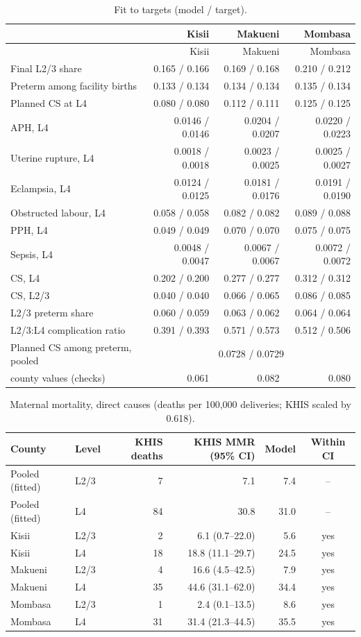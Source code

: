 \documentclass[11pt]{article}
\begin{document}
\begin{longtable}{lrrr}
\caption{Fit to targets (model / target).}\label{tab:fit}\\
\toprule
 & Kisii & Makueni & Mombasa \\
\midrule
\endfirsthead
\toprule
 & Kisii & Makueni & Mombasa \\
\midrule
\endhead
Final L2/3 share & 0.165 / 0.166 & 0.169 / 0.168 & 0.210 / 0.212 \\
Preterm among facility births & 0.133 / 0.134 & 0.134 / 0.134 & 0.135 / 0.134 \\
Planned CS at L4 & 0.080 / 0.080 & 0.112 / 0.111 & 0.125 / 0.125 \\
APH, L4 & 0.0146 / 0.0146 & 0.0204 / 0.0207 & 0.0220 / 0.0223 \\
Uterine rupture, L4 & 0.0018 / 0.0018 & 0.0023 / 0.0025 & 0.0025 / 0.0027 \\
Eclampsia, L4 & 0.0124 / 0.0125 & 0.0181 / 0.0176 & 0.0191 / 0.0190 \\
Obstructed labour, L4 & 0.058 / 0.058 & 0.082 / 0.082 & 0.089 / 0.088 \\
PPH, L4 & 0.049 / 0.049 & 0.070 / 0.070 & 0.075 / 0.075 \\
Sepsis, L4 & 0.0048 / 0.0047 & 0.0067 / 0.0067 & 0.0072 / 0.0072 \\
CS, L4 & 0.202 / 0.200 & 0.277 / 0.277 & 0.312 / 0.312 \\
CS, L2/3 & 0.040 / 0.040 & 0.066 / 0.065 & 0.086 / 0.085 \\
L2/3 preterm share & 0.060 / 0.059 & 0.063 / 0.062 & 0.064 / 0.064 \\
L2/3:L4 complication ratio & 0.391 / 0.393 & 0.571 / 0.573 & 0.512 / 0.506 \\
\midrule
Planned CS among preterm, pooled & \multicolumn{3}{c}{0.0728 / 0.0729} \\
\quad county values (checks) & 0.061 & 0.082 & 0.080 \\
\bottomrule
\end{longtable}

\begin{table}[htbp]
\centering
\caption{Maternal mortality, direct causes (deaths per 100,000 deliveries;
KHIS scaled by 0.618).}
\label{tab:mortality}
\begin{tabular}{llrrrc}
\toprule
County & Level & KHIS deaths & KHIS MMR (95\% CI) & Model & Within CI \\
\midrule
Pooled (fitted) & L2/3 & 7 & 7.1 & 7.4 & -- \\
Pooled (fitted) & L4 & 84 & 30.8 & 31.0 & -- \\
\midrule
Kisii & L2/3 & 2 & 6.1 (0.7--22.0) & 5.6 & yes \\
Kisii & L4 & 18 & 18.8 (11.1--29.7) & 24.5 & yes \\
Makueni & L2/3 & 4 & 16.6 (4.5--42.5) & 7.9 & yes \\
Makueni & L4 & 35 & 44.6 (31.1--62.0) & 34.4 & yes \\
Mombasa & L2/3 & 1 & 2.4 (0.1--13.5) & 8.6 & yes \\
Mombasa & L4 & 31 & 31.4 (21.3--44.5) & 35.5 & yes \\
\bottomrule
\end{tabular}
\end{table}
\end{document}

